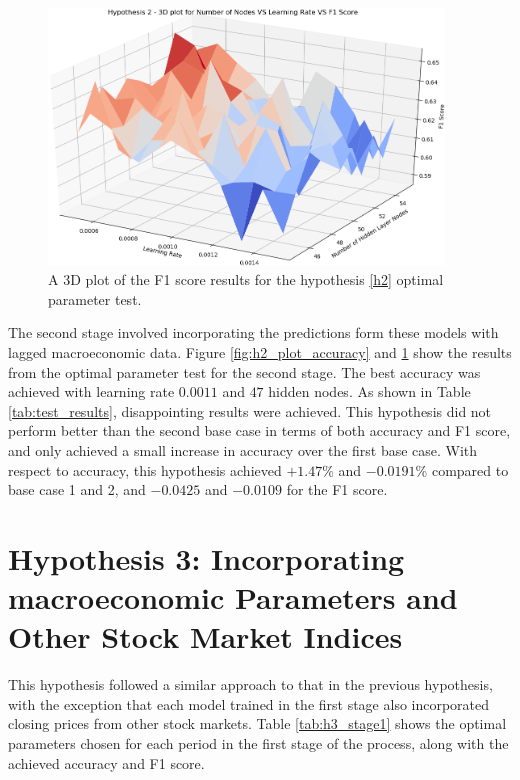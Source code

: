 \documentclass{UoYCSproject}
\begin{document}
\begin{figure}[h]
\includegraphics[width=10.5cm]{h2_f1.png}
\centering
\caption{A 3D plot of the F1 score results for the hypothesis \ref{h2} optimal parameter test.} 
\label{fig:h2_plot_f1}
\end{figure}

The second stage involved incorporating the predictions form these models with lagged macroeconomic data. Figure \ref{fig:h2_plot_accuracy} and \ref{fig:h2_plot_f1} show the results from the optimal parameter test for the second stage. The best accuracy was achieved with learning rate $0.0011$ and $47$ hidden nodes. 
As shown in Table \ref{tab:test_results}, disappointing results were achieved. This hypothesis did not perform better than the second base case in terms of both accuracy and F1 score, and only achieved a small increase in accuracy over the first base case. With respect to accuracy, this hypothesis achieved $+1.47$\% and $-0.0191$\% compared to base case 1 and 2, and  $-0.0425$ and $-0.0109$ for the F1 score.   

\section{Hypothesis 3: Incorporating macroeconomic Parameters and Other Stock Market Indices}
This hypothesis followed a similar approach to that in the previous hypothesis, with the exception that each model trained in the first stage also incorporated closing prices from other stock markets. Table \ref{tab:h3_stage1} shows the optimal parameters chosen for each period in the first stage of the process, along with the achieved accuracy and F1 score. 
\end{document}

